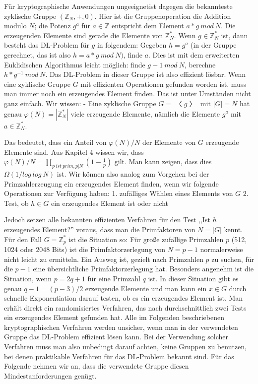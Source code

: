 \documentclass[a4paper]{article}
\begin{document}
\begin{multicols}{3}
{{{{        Für kryptographische Anwendungen ungeeignetist dagegen die bekannteste zyklische Gruppe $(\mathbb{Z}_N,+,0)$. Hier ist die Gruppenoperation die Addition modulo $N$; die Potenz $g^a$ für $a\in\mathbb{Z}$ entspricht dem Element $a*g\ mod\ N$. Die erzeugenden Elemente sind gerade die Elemente von $\mathbb{Z}^*_N$. Wenn $g\in\mathbb{Z}^*_N$ ist, dann besteht das DL-Problem für $g$ in folgendem: Gegeben $h=g^a$ (in der Gruppe gerechnet, das ist also $h=a*g\ mod\ N)$, finde $a$. Dies ist mit dem erweiterten Euklidischen Algorithmus leicht möglich: finde $g-1\ mod\ N$, berechne $h*g^{-1}\ mod\ N$. Das DL-Problem in dieser Gruppe ist also effizient lösbar.
        Wenn eine zyklische Gruppe $G$ mit effizienten Operationen gefunden worden ist, muss man immer noch ein erzeugendes Element finden. Das ist unter Umständen nicht ganz einfach. Wir wissen:
        - Eine zyklische Gruppe $G=〈g〉$ mit $|G|=N$ hat genau $\varphi(N) = |\mathbb{Z}^*_N|$ viele erzeugende Elemente, nämlich die Elemente $g^a$ mit $a\in\mathbb{Z}^*_N$.

        Das bedeutet, dass ein Anteil von $\varphi(N)/N$ der Elemente von $G$ erzeugende Elemente sind. Aus Kapitel 4 wissen wir, dass $\varphi(N)/N=\prod_{p\ ist\ prim, p|N}(1-\frac{1}{p})$ gilt. Man kann zeigen, dass dies $\Omega(1/log\ log\ N)$ ist. Wir können also analog zum Vorgehen bei der Primzahlerzeugung ein erzeugendes Element finden, wenn wir folgende Operationen zur Verfügung haben:
        1. zufälliges Wählen eines Elements von $G$
        2. Test, ob $h\in G$ ein erzeugendes Element ist oder nicht

        Jedoch setzen alle bekannten effizienten Verfahren für den Test ,,Ist $h$ erzeugendes Element?'' voraus, dass man die Primfaktoren von $N=|G|$ kennt.
        Für den Fall $G=\mathbb{Z}^*_p$ ist die Situation so: Für große zufällige Primzahlen $p$ (512, 1024 oder 2048 Bits) ist die Primfaktorzerlegung von $N=p-1$ normalerweise nicht leicht zu ermitteln. Ein Ausweg ist, gezielt nach Primzahlen $p$ zu suchen, für die $p-1$ eine übersichtliche Primfaktorzerlegung hat. Besonders angenehm ist die Situation, wenn $p=2q+1$ für eine Primzahl $q$ ist.
        In dieser Situation gibt es genau $q-1=(p-3)/2$ erzeugende Elemente und man kann ein $x\in G$ durch schnelle Exponentiation darauf testen, ob es ein erzeugendes Element ist. Man erhält direkt ein randomisiertes Verfahren, das nach durchschnittlich zwei Tests ein erzeugendes Element gefunden hat.
        Alle im Folgenden beschriebenen kryptographischen Verfahren werden unsicher, wenn man in der verwendeten Gruppe das DL-Problem effizient lösen kann. Bei der Verwendung solcher Verfahren muss man also unbedingt darauf achten, keine Gruppen zu benutzen, bei denen praktikable Verfahren für das DL-Problem bekannt sind.
        Für das Folgende nehmen wir an, dass die verwendete Gruppe diesen Mindestanforderungen genügt.

}}}}
\end{multicols}
\end{document}
